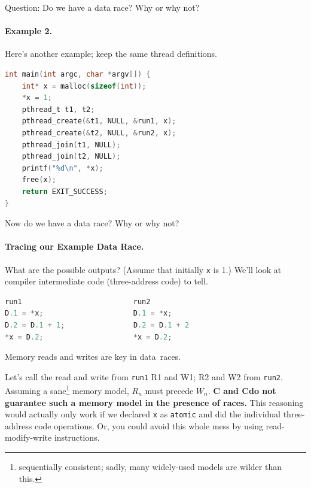 \documentclass[a4paper]{report}
\newcommand{\CPP}{C\nolinebreak\hspace{-.05em}\raisebox{.4ex}{\tiny\bf +}\nolinebreak\hspace{-.10em}\raisebox{.4ex}{\tiny\bf +}}
\def\CPP{{C\nolinebreak[4]\hspace{-.05em}\raisebox{.4ex}{\tiny\bf ++}}}
\begin{document}
\noindent
Question: Do we have a data race? Why or why not?
\vspace*{2em}

\paragraph{Example 2.} Here's another example; keep the same thread definitions.
\begin{lstlisting}[language=C]
int main(int argc, char *argv[]) {
    int* x = malloc(sizeof(int));
    *x = 1;
    pthread_t t1, t2;
    pthread_create(&t1, NULL, &run1, x);
    pthread_create(&t2, NULL, &run2, x);
    pthread_join(t1, NULL);
    pthread_join(t2, NULL);
    printf("%d\n", *x);
    free(x);
    return EXIT_SUCCESS;
}
\end{lstlisting}

Now do we have a data race? Why or why not?
\vspace*{2em}


\paragraph{Tracing our Example Data Race.} 
What are the possible outputs? (Assume that initially {\tt *x} is 1.)
We'll look at compiler intermediate code (three-address code) to tell.

\hspace*{.2\textwidth}\begin{minipage}{.8\textwidth}
\begin{lstlisting}[language=C]
run1                          run2   
D.1 = *x;                     D.1 = *x;
D.2 = D.1 + 1;                D.2 = D.1 + 2
*x = D.2;                     *x = D.2;
  \end{lstlisting}
\end{minipage}

Memory reads and writes are key in data~races.

Let's call the read and write from {\tt run1} R1 and W1; R2 and W2
from {\tt run2}. Assuming a sane\footnote{sequentially consistent; sadly, many
widely-used models are wilder than this.}
memory model, $R_n$ must precede $W_n$. {\bf C and \CPP do not guarantee
  such a memory model in the presence of races.} This reasoning would
actually only work if we declared {\tt x} as {\tt atomic} and did the
individual three-address code operations. Or, you could avoid this whole
mess by using read-modify-write instructions.
\end{document}

